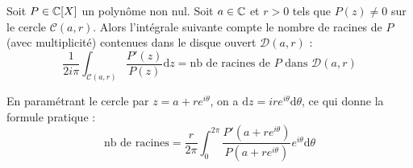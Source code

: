 \begin{propositionnt}{}{}
    Soit $P \in \mathbb{C}[X]$ un polynôme non nul. Soit $a \in \mathbb{C}$ et $r > 0$ tels que $P(z) \neq 0$ sur le cercle $\mathcal{C}(a, r)$. Alors l'intégrale suivante compte le nombre de racines de $P$ (avec multiplicité) contenues dans le disque ouvert $\mathcal{D}(a, r)$ :
    \[ \frac{1}{2i\pi} \int_{\mathcal{C}(a,r)} \frac{P'(z)}{P(z)} \mathrm{d}z = \text{nb de racines de } P \text{ dans } \mathcal{D}(a,r) \]
    
    En paramétrant le cercle par $z = a + r e^{i\theta}$, on a $\mathrm{d}z = i r e^{i\theta} \mathrm{d}\theta$, ce qui donne la formule pratique :
    \[ \text{nb de racines} = \frac{r}{2\pi} \int_{0}^{2\pi} \frac{P'(a + r e^{i\theta})}{P(a + r e^{i\theta})} e^{i\theta} \mathrm{d}\theta \]
\end{propositionnt}



